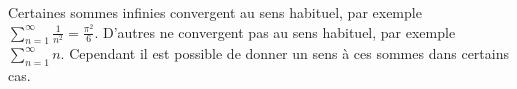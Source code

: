 Certaines sommes infinies convergent au sens habituel, par exemple $\sum_{n=1}^\infty \frac{1}{n^2} = \frac{\pi^2}{6}$. D'autres ne convergent pas au sens habituel, par exemple $\sum_{n=1}^\infty n$. Cependant il est possible de donner un sens à ces sommes dans certains cas.